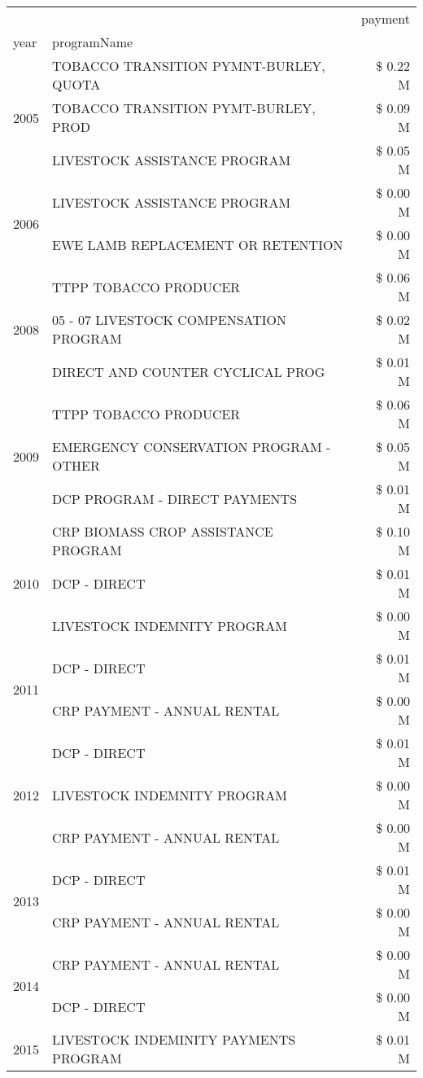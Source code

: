 \begin{tabular}{llr}
\toprule
 &  & payment \\
year & programName &  \\
\midrule
\multirow[t]{3}{*}{2005} & TOBACCO TRANSITION PYMNT-BURLEY, QUOTA & \$ 0.22 M \\
 & TOBACCO TRANSITION PYMT-BURLEY, PROD & \$ 0.09 M \\
 & LIVESTOCK ASSISTANCE PROGRAM & \$ 0.05 M \\
\cline{1-3}
\multirow[t]{2}{*}{2006} & LIVESTOCK ASSISTANCE PROGRAM & \$ 0.00 M \\
 & EWE LAMB REPLACEMENT OR RETENTION & \$ 0.00 M \\
\cline{1-3}
\multirow[t]{3}{*}{2008} & TTPP TOBACCO PRODUCER & \$ 0.06 M \\
 & 05 - 07 LIVESTOCK COMPENSATION PROGRAM & \$ 0.02 M \\
 & DIRECT AND COUNTER CYCLICAL PROG & \$ 0.01 M \\
\cline{1-3}
\multirow[t]{3}{*}{2009} & TTPP TOBACCO PRODUCER & \$ 0.06 M \\
 & EMERGENCY CONSERVATION PROGRAM - OTHER & \$ 0.05 M \\
 & DCP PROGRAM - DIRECT PAYMENTS & \$ 0.01 M \\
\cline{1-3}
\multirow[t]{3}{*}{2010} & CRP BIOMASS CROP ASSISTANCE PROGRAM & \$ 0.10 M \\
 & DCP - DIRECT & \$ 0.01 M \\
 & LIVESTOCK INDEMNITY PROGRAM & \$ 0.00 M \\
\cline{1-3}
\multirow[t]{2}{*}{2011} & DCP - DIRECT & \$ 0.01 M \\
 & CRP PAYMENT - ANNUAL RENTAL & \$ 0.00 M \\
\cline{1-3}
\multirow[t]{3}{*}{2012} & DCP - DIRECT & \$ 0.01 M \\
 & LIVESTOCK INDEMNITY PROGRAM & \$ 0.00 M \\
 & CRP PAYMENT - ANNUAL RENTAL & \$ 0.00 M \\
\cline{1-3}
\multirow[t]{2}{*}{2013} & DCP - DIRECT & \$ 0.01 M \\
 & CRP PAYMENT - ANNUAL RENTAL & \$ 0.00 M \\
\cline{1-3}
\multirow[t]{2}{*}{2014} & CRP PAYMENT - ANNUAL RENTAL & \$ 0.00 M \\
 & DCP - DIRECT & \$ 0.00 M \\
\cline{1-3}
\multirow[t]{2}{*}{2015} & LIVESTOCK INDEMINITY PAYMENTS PROGRAM & \$ 0.01 M \\

\end{tabular}
